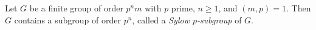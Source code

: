 Let $G$ be a finite group of order $p^n m$ with $p$ prime, $n \geq 1$, and $(m,p) = 1$. Then $G$ contains a subgroup of order $p^n$, called a \emph{Sylow $p$-subgroup} of $G$.

